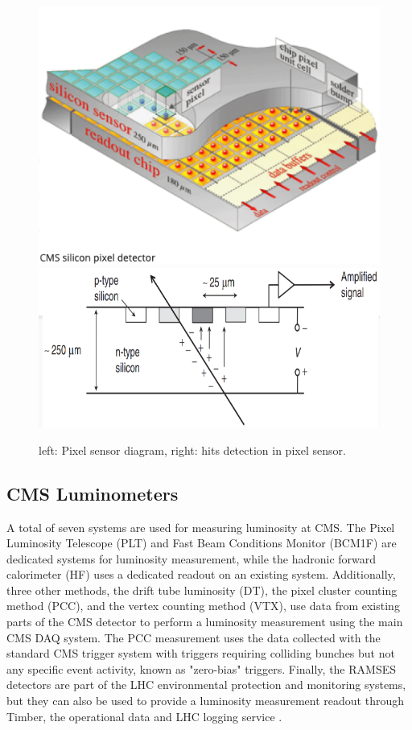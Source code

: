 \begin{center}
  \begin{figure}[h]
    \centering
    \includegraphics[scale=.3]{Chapter2/PixelSensor.png} \includegraphics[scale=.3]{Chapter2/hit.png}
    \caption[PixelSensor]{ left: Pixel sensor diagram, right: hits detection in pixel sensor. }
    \label{module and hit}
  \end{figure}
\end{center}
\subsection{CMS Luminometers}
A total of seven systems are used for measuring luminosity at CMS. The Pixel Luminosity Telescope (PLT) and Fast Beam Conditions Monitor (BCM1F) are dedicated systems for luminosity measurement, while the hadronic forward calorimeter (HF) uses a dedicated readout on an existing system. Additionally, three other methods, the drift tube luminosity (DT), the pixel cluster counting method (PCC), and the vertex counting method (VTX), use data from existing parts of the CMS detector to perform a luminosity measurement using the main CMS DAQ system. The PCC measurement uses the data collected with the standard CMS trigger system with triggers requiring colliding bunches but not any specific event activity, known as "zero-bias" triggers. Finally, the RAMSES detectors are part of the LHC environmental protection and monitoring systems, but they can also be used to provide a luminosity measurement readout through Timber, the operational data and LHC logging service \cite{pas_18}.


